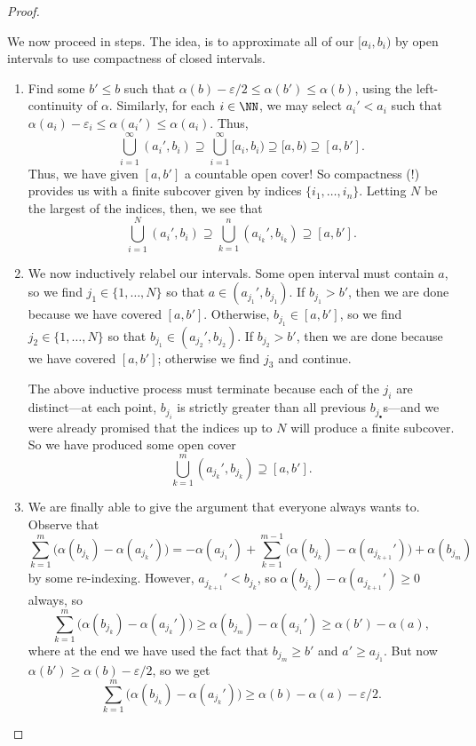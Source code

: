 \documentclass[../notes.tex]{subfiles}
\begin{document}
\begin{proof}
\begin{itemize}
		We now proceed in steps. The idea, is to approximate all of our $[a_i,b_i)$ by open intervals to use compactness of closed intervals.

		\begin{enumerate}
			\item Find some $b'\le b$ such that $\alpha(b)-\varepsilon/2\le\alpha(b')\le\alpha(b)$, using the left-continuity of $\alpha$. Similarly, for each $i\in\NN$, we may select $a_i'<a_i$ such that $\alpha(a_i)-\varepsilon_i\le\alpha(a_i')\le\alpha(a_i)$. Thus,
			\[\bigcup_{i=1}^\infty(a_i',b_i)\supseteq\bigcup_{i=1}^\infty[a_i,b_i)\supseteq[a,b)\supseteq[a,b'].\]
			Thus, we have given $[a,b']$ a countable open cover! So compactness (!) provides us with a finite subcover given by indices $\{i_1,\ldots,i_n\}$. Letting $N$ be the largest of the indices, then, we see that
			\[\bigcup_{i=1}^N(a_i',b_i)\supseteq\bigcup_{k=1}^n(a_{i_k}',b_{i_k})\supseteq[a,b'].\]
			
			\item We now inductively relabel our intervals. Some open interval must contain $a$, so we find $j_1\in\{1,\ldots,N\}$ so that $a\in(a_{j_1}',b_{j_1})$. If $b_{j_1}>b'$, then we are done because we have covered $[a,b']$. Otherwise, $b_{j_1}\in[a,b']$, so we find $j_2\in\{1,\ldots,N\}$ so that $b_{j_1}\in(a_{j_2}',b_{j_2})$. If $b_{j_2}>b'$, then we are done because we have covered $[a,b']$; otherwise we find $j_3$ and continue.
	
			The above inductive process must terminate because each of the $j_i$ are distinct---at each point, $b_{j_i}$ is strictly greater than all previous $b_{j_\bullet}$s---and we were already promised that the indices up to $N$ will produce a finite subcover. So we have produced some open cover
			\[\bigcup_{k=1}^m(a_{j_k}',b_{j_k})\supseteq[a,b'].\]
			
			\item We are finally able to give the argument that everyone always wants to. Observe that
			\[\sum_{k=1}^m\big(\alpha(b_{j_k})-\alpha(a_{j_k}')\big) = -\alpha(a_{j_1}')+\sum_{k=1}^{m-1}\big(\alpha(b_{j_k})-\alpha(a_{j_{k+1}}')\big)+\alpha(b_{j_m})\]
			by some re-indexing. However, $a_{j_{k+1}}'<b_{j_k}$, so $\alpha(b_{j_k})-\alpha(a_{j_{k+1}}')\ge0$ always, so
			\[\sum_{k=1}^m\big(\alpha(b_{j_k})-\alpha(a_{j_k}')\big)\ge\alpha(b_{j_m})-\alpha(a_{j_1}')\ge\alpha(b')-\alpha(a),\]
			where at the end we have used the fact that $b_{j_m}\ge b'$ and $a'\ge a_{j_1}$. But now $\alpha(b')\ge\alpha(b)-\varepsilon/2$, so we get
			\begin{equation}
				\sum_{k=1}^m\big(\alpha(b_{j_k})-\alpha(a_{j_k}')\big)\ge\alpha(b)-\alpha(a)-\varepsilon/2. \label{eq:leb-premeas-hard-1}
			\end{equation}
			

\end{enumerate}
\end{itemize}
\end{proof}
\end{document}

